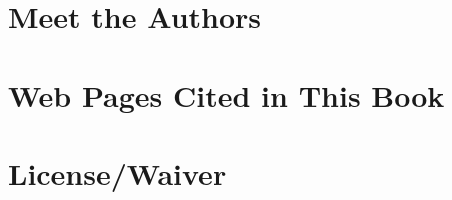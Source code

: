 \documentclass[ebook, 12pt, twoside]{memoir}
\begin{document}
\chapter[\textbf{Meet the Authors}]{Meet the Authors}
%

%
%

\cleardoublepage
\begingroup
\renewcommand{\cleardoublepage}{}
\renewcommand{\clearpage}{}
\chapter{Web Pages Cited in This Book}
\renewcommand{\indexname}{}
\vspace{-1in}
\onecolindex
\printindex
\endgroup

\newpage
\chapter[\textbf{License/Waiver}]{License/Waiver}

%
\pagestyle{empty} \thispagestyle{empty}
\clearpage\mbox{}\clearpage\mbox{}\clearpage\mbox{}\clearpage    %
\end{document}
